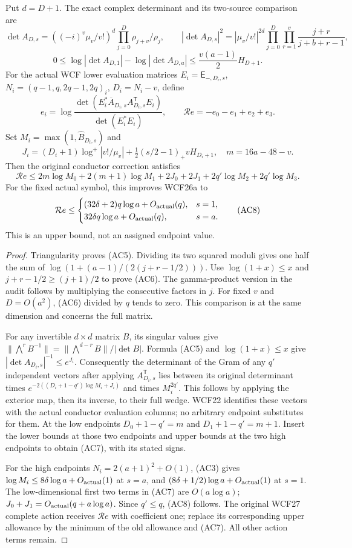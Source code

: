 \begin{proposition}
Put $d=D+1$. The exact complex determinant and its two-source comparison are
\[
 \det A_{D,s}=((-i)^v\mu_v/v!)^d\prod_{j=0}^D\rho_{j+v}/\rho_j,
 \qquad
 |\det A_{D,s}|^2=|\mu_v/v!|^{2d}
 \prod_{j=0}^D\prod_{r=1}^v\frac{j+r}{j+b+r-1},\tag{AC5}
\]
\[
 0\le\log|\det A_{D,1}|-\log|\det A_{D,a}|
 \le\frac{v(a-1)}2 H_{D+1}.\tag{AC6}
\]
For the actual WCF lower evaluation matrices $E_i=\mathsf E_{-,D_i,s}$,
$N_i=(q-1,q,2q-1,2q)_i$, $D_i=N_i-v$, define
\[
 e_i=\log\frac{\det(E_i^*\overline A_{D_i,s}A_{D_i,s}^{\mathsf T}E_i)}
 {\det(E_i^*E_i)},\qquad \mathcal R e=-e_0-e_1+e_2+e_3.
\]
Set $M_i=\max(1,\widehat B_{D_i,s})$ and
\[
 J_i=(D_i+1)\log^+|v!/\mu_v|
       +\tfrac12(s/2-1)_+vH_{D_i+1},\quad m=16a-48-v.
\]
Then the original conductor correction satisfies
\[
 \mathcal R e\le
 2m\log M_0+2(m+1)\log M_1+2J_0+2J_1
 +2q'\log M_2+2q'\log M_3.\tag{AC7}
\]
For the fixed actual symbol, this improves WCF26a to
\[
 \mathcal R e\le
 \begin{cases}
 (32\delta+2)q\log a+O_{\rm actual}(q),&s=1,\\
 32\delta q\log a+O_{\rm actual}(q),&s=a.
 \end{cases}\tag{AC8}
\]
This is an upper bound, not an assigned endpoint value.
\end{proposition}
\begin{proof}
Triangularity proves (AC5). Dividing its two squared moduli gives
one half the sum of
$\log(1+(a-1)/(2(j+r-1/2)))$. Use $\log(1+x)\le x$ and
$j+r-1/2\ge(j+1)/2$ to prove (AC6). The gamma-product version in
the audit follows by multiplying the consecutive factors in $j$.
For fixed $v$ and $D=O(a^2)$, (AC6) divided by $q$ tends to zero.
This comparison is at the same dimension and concerns the full matrix.

For any invertible $d\times d$ matrix $B$, its singular values give
$\|\bigwedge^rB^{-1}\|=\|\bigwedge^{d-r}B\|/|\det B|$.
Formula (AC5) and $\log(1+x)\le x$ give
$|\det A_{D_i,s}|^{-1}\le e^{J_i}$. Consequently the determinant
of the Gram of any $q'$ independent vectors after applying
$A_{D_i,s}^{\mathsf T}$ lies between its original determinant times
$e^{-2((D_i+1-q')\log M_i+J_i)}$ and times $M_i^{2q'}$.
This follows by applying the exterior map, then its inverse, to their
full wedge. WCF22 identifies these vectors with the actual conductor
evaluation columns; no arbitrary endpoint substitutes for them.
At the low endpoints $D_0+1-q'=m$ and $D_1+1-q'=m+1$.
Insert the lower bounds at those two endpoints and upper bounds at the
two high endpoints to obtain (AC7), with its stated signs.

For the high endpoints $N_i=2(a+1)^2+O(1)$, (AC3) gives
$\log M_i\le8\delta\log a+O_{\rm actual}(1)$ at $s=a$, and
$(8\delta+1/2)\log a+O_{\rm actual}(1)$ at $s=1$.
The low-dimensional first two terms in (AC7) are $O(a\log a)$;
$J_0+J_1=O_{\rm actual}(q+a\log a)$. Since $q'\le q$, (AC8)
follows. The original WCF27 complete action receives $\mathcal R e$
with coefficient one; replace its corresponding upper allowance by
the minimum of the old allowance and (AC7). All other action terms remain.
\end{proof}

